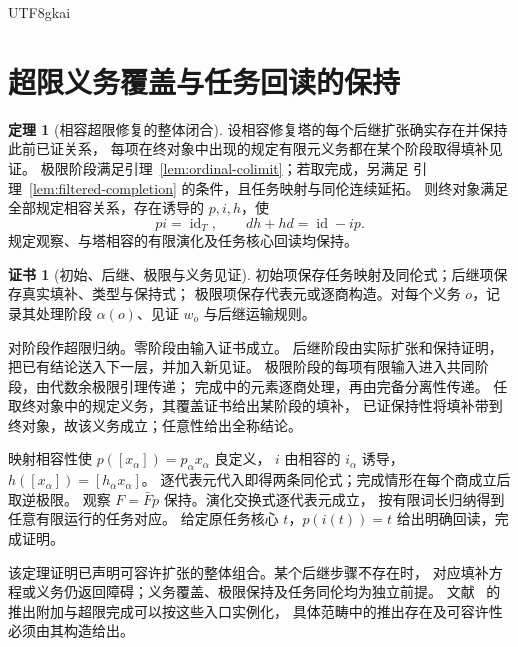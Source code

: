 \documentclass[12pt]{report}
\makeatletter
\theoremstyle{definition}
\newtheorem{theorem}{定理}[chapter]
\newtheorem{Certificate}{证书}[chapter]
\renewenvironment{proof}[1][\proofname]{\par
  \pushQED{\qed}\normalfont
  \topsep6\p@\@plus6\p@\relax
  \trivlist
  \item[\hskip\labelsep\normalfont #1\@addpunct{.}]\ignorespaces
}{
  \popQED\endtrivlist\@endpefalse
}
\newcommand{\id}{\operatorname{id}}
\makeatother
\begin{document}
\begin{CJK*}{UTF8}{gkai}
\section{超限义务覆盖与任务回读的保持}
\begin{theorem}[相容超限修复的整体闭合]
\label{thm:transfinite-task}
设相容修复塔的每个后继扩张确实存在并保持此前已证关系，
每项在终对象中出现的规定有限元义务都在某个阶段取得填补见证。
极限阶段满足引理~\ref{lem:ordinal-colimit}；若取完成，另满足
引理~\ref{lem:filtered-completion} 的条件，且任务映射与同伦连续延拓。
则终对象满足全部规定相容关系，存在诱导的 \(p,i,h\)，使
\[
pi=\id_T,\qquad dh+hd=\id-ip.
\]
规定观察、与塔相容的有限演化及任务核心回读均保持。
\end{theorem}
\begin{Certificate}[初始、后继、极限与义务见证]
初始项保存任务映射及同伦式；后继项保存真实填补、类型与保持式；
极限项保存代表元或逐商构造。对每个义务 \(o\)，记录其处理阶段
\(\alpha(o)\)、见证 \(w_o\) 与后继运输规则。
\end{Certificate}
\begin{proof}
对阶段作超限归纳。零阶段由输入证书成立。
后继阶段由实际扩张和保持证明，把已有结论送入下一层，并加入新见证。
极限阶段的每项有限输入进入共同阶段，由代数余极限引理传递；
完成中的元素逐商处理，再由完备分离性传递。
任取终对象中的规定义务，其覆盖证书给出某阶段的填补，
已证保持性将填补带到终对象，故该义务成立；任意性给出全称结论。

映射相容性使 \(p([x_\alpha])=p_\alpha x_\alpha\) 良定义，
\(i\) 由相容的 \(i_\alpha\) 诱导，\(h([x_\alpha])=[h_\alpha x_\alpha]\)。
逐代表元代入即得两条同伦式；完成情形在每个商成立后取逆极限。
观察 \(F=\bar Fp\) 保持。演化交换式逐代表元成立，
按有限词长归纳得到任意有限运行的任务对应。
给定原任务核心 \(t\)，\(p(i(t))=t\) 给出明确回读，完成证明。
\end{proof}
该定理证明已声明可容许扩张的整体组合。某个后继步骤不存在时，
对应填补方程或义务仍返回障碍；义务覆盖、极限保持及任务同伦均为独立前提。
文献~\cite{pure,homotopyworkflow} 的推出附加与超限完成可以按这些入口实例化，
具体范畴中的推出存在及可容许性必须由其构造给出。


\end{CJK*}
\end{document}
